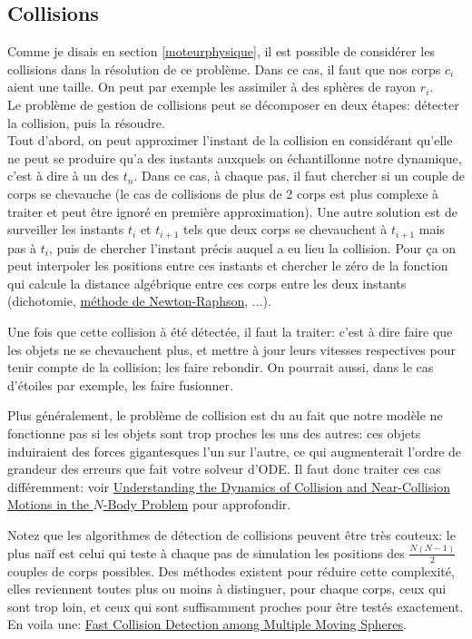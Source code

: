 \documentclass{article}
\begin{document}
\subsection{Collisions}
\label{collisions}

Comme je disais en section \ref{moteurphysique}, il est possible de considérer les collisions dans la résolution de ce problème. Dans ce cas, il faut que nos corps $c_i$ aient une taille. On peut par exemple les assimiler à des sphères de rayon $r_i$.\\
Le problème de gestion de collisions peut se décomposer en deux étapes: détecter la collision, puis la résoudre.\\

Tout d'abord, on peut approximer l'instant de la collision en considérant qu'elle ne peut se produire qu'a des instants auxquels on échantillonne notre dynamique, c'est à dire à un des $t_n$. Dans ce cas, à chaque pas, il faut chercher si un couple de corps se chevauche (le cas de collisions de plus de 2 corps est plus complexe à traiter et peut être ignoré en première approximation). Une autre solution est de surveiller les instants $t_i$ et $t_{i+1}$ tels que deux corps se chevauchent à $t_{i+1}$ mais pas à $t_i$, puis de chercher l'instant précis auquel a eu lieu la collision. Pour ça on peut interpoler les positions entre ces instants et chercher le zéro de la fonction qui calcule la distance algébrique entre ces corps entre les deux instants (dichotomie, \href{https://en.wikipedia.org/wiki/Newton\%27s_method}{méthode de Newton-Raphson}, ...).

Une fois que cette collision à été détectée, il faut la traiter: c'est à dire faire que les objets ne se chevauchent plus, et mettre à jour leurs vitesses respectives pour tenir compte de la collision; les faire rebondir. On pourrait aussi, dans le cas d'étoiles par exemple, les faire fusionner.

Plus généralement, le problème de collision est du au fait que notre modèle ne fonctionne pas si les objets sont trop proches les uns des autres: ces objets induiraient des forces gigantesques l'un sur l'autre, ce qui augmenterait l'ordre de grandeur des erreurs que fait votre solveur d'ODE. Il faut donc traiter ces cas différemment: voir \href{https://arxiv.org/pdf/1208.6313.pdf}{Understanding the Dynamics of Collision and Near-Collision Motions in the $N$-Body Problem} pour approfondir.

Notez que les algorithmes de détection de collisions peuvent être très couteux: le plus naïf est celui qui teste à chaque pas de simulation les positions des $\frac{N(N-1)}{2}$ couples de corps possibles. Des méthodes existent pour réduire cette complexité, elles reviennent toutes plus ou moins à distinguer, pour chaque corps, ceux qui sont trop loin, et ceux qui sont suffisamment proches pour être testés exactement. En voila une:  \href{https://www2.cs.duke.edu/courses/cps124/fall01/resources/p373-kim.pdf}{Fast Collision Detection among Multiple Moving Spheres}.
\end{document}
